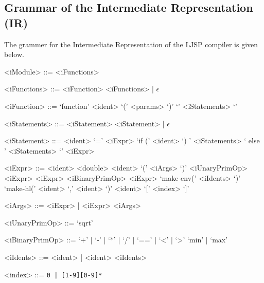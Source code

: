 \documentclass[11pt]{report}
\begin{document}
\subsection{Grammar of the Intermediate Representation (IR)}
The grammer for the Intermediate Representation of the LJSP compiler is given below.
\begin{grammar}
<iModule> ::= <iFunctions>

<iFunctions> ::= <iFunction> <iFunctions> | $\epsilon$

<iFunction> ::= `function' <ident> `(' <params> `)' `{' <iStatements> `}'

<iStatements> ::= <iStatement> <iStatement> | $\epsilon$

<iStatement> ::= <ident> `=' <iExpr>
\alt `if (' <ident> `) {' <iStatements> `} else {' <iStatements> `}'
\alt <iExpr>

<iExpr> ::= <ident>
\alt <double>
\alt <ident> `(' <iArgs> `)'
\alt <iUnaryPrimOp> <iExpr>
\alt <iExpr> <iBinaryPrimOp> <iExpr>
\alt `make-env(' <iIdents> `)'
\alt `make-hl(' <ident> `,' <ident> `)'
\alt <ident> `[' <index> `]'

<iArgs> ::= <iExpr> | <iExpr> <iArgs>

<iUnaryPrimOp> ::= `sqrt'

<iBinaryPrimOp> ::= `+' | `-' | `*' | `/'
\alt | `==' | `<' | `>'
\alt `min' | `max'

<iIdents> ::= <ident> | <ident> <iIdents>

<index> ::= \texttt{0 | [1-9][0-9]*}


\end{grammar}




\end{document}
